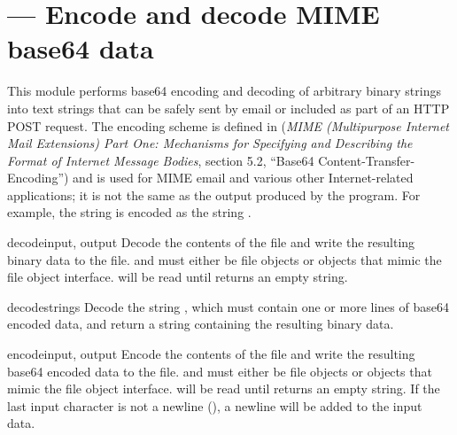 \section{ ---
         Encode and decode MIME base64 data}




This module performs base64 encoding and decoding of arbitrary binary
strings into text strings that can be safely sent by email or included
as part of an HTTP POST request.  The
encoding scheme is defined in  (\emph{MIME
(Multipurpose Internet Mail Extensions) Part One: Mechanisms for
Specifying and Describing the Format of Internet Message Bodies},
section 5.2, ``Base64 Content-Transfer-Encoding'') and is used for
MIME email and various other Internet-related applications; it is not
the same as the output produced by the  program.
For example, the string  is encoded as the
string .  


\begin{funcdesc}{decode}{input, output}
Decode the contents of the  file and write the resulting
binary data to the  file.
 and  must either be file objects or objects that
mimic the file object interface.  will be read until
 returns an empty string.
\end{funcdesc}

\begin{funcdesc}{decodestring}{s}
Decode the string , which must contain one or more lines of
base64 encoded data, and return a string containing the resulting
binary data.
\end{funcdesc}

\begin{funcdesc}{encode}{input, output}
Encode the contents of the  file and write the resulting
base64 encoded data to the  file.
 and  must either be file objects or objects that
mimic the file object interface.  will be read until
 returns an empty string.  If the last input
character is not a newline (), a newline will be added to
the input data.
\end{funcdesc}


